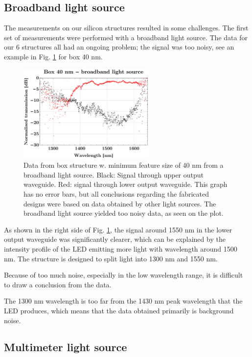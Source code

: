 \subsection{Broadband light source}
The measurements on our silicon structures resulted in some challenges. The first set of measurements were performed with a broadband light source. The data for our 6 structures all had an ongoing problem; the signal was too noisy, see an example in Fig. \ref{fig:Lightsource1Rep} for box 40 nm.

\begin{figure}[H]
    \centering
    \includegraphics[width=0.6\textwidth]
        {fig/Kilde1Broadband/box40broadband.pdf}
    \caption{Data from box structure w. minimum feature size of 40 nm from a broadband light source. Black: Signal through upper output waveguide. Red: signal through lower output waveguide. This graph has no error bars, but all conclusions regarding the fabricated designs were based on data obtained by other light sources. The broadband light source yielded too noisy data, as seen on the plot.}
    \label{fig:Lightsource1Rep}
\end{figure}

As shown in the right side of Fig. \ref{fig:Lightsource1Rep}, the signal around 1550 nm in the lower output waveguide was significantly clearer, which can be explained by the intensity profile of the LED emitting more light with wavelength around 1500 nm. The structure is designed to split light into 1300 nm and 1550 nm. 

Because of too much noise, especially in the low wavelength range, it is difficult to draw a conclusion from the data.

The 1300 nm wavelength is too far from the 1430 nm peak wavelength that the LED produces, which means that the data obtained primarily is background noise.

\subsection{Multimeter light source}

